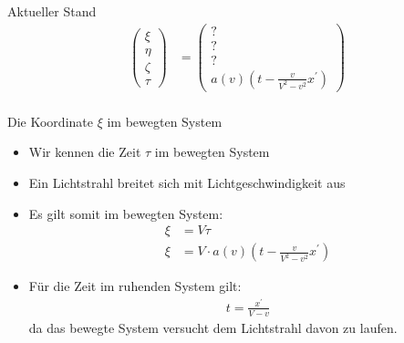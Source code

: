 \documentclass[]{beamer}%
\begin{document}
\begin{frame}{Aktueller Stand}
    \begin{align*}
        \begin{pmatrix}
            \xi \\ 
            \eta \\ 
            \zeta\\ 
            \tau 
        \end{pmatrix}
   &=
        \begin{pmatrix}
            ? \\ 
            ? \\ 
            ? \\ 
            a\left( v \right) 
                \left( 
                    t-\tfrac{v}{V^2-v^2} x^\prime
                \right)
        \end{pmatrix}\\
    \end{align*}
\end{frame}

\begin{frame}{Die Koordinate $\xi$ im bewegten System}
    \begin{itemize}
        \item Wir kennen die Zeit $\tau$ im bewegten System
        \item Ein Lichtstrahl breitet sich mit Lichtgeschwindigkeit aus
        \item Es gilt somit im bewegten System:
            \begin{align*}
                \xi     &=  V\tau\\
                \xi     &=  V \cdot a\left(v\right) \left(
                                t-\frac{v}{V^2-v^2} x^\prime
                            \right)
            \end{align*}
        \item Für die Zeit im ruhenden System gilt:
            \begin{align*}
                t   =   \frac{x^\prime}{V-v}
            \end{align*}
            da das bewegte System versucht dem Lichtstrahl davon zu laufen. 
    \end{itemize}
\end{frame}
\end{document}
